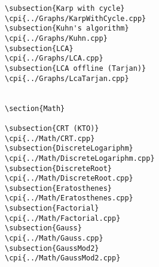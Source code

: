 {\begin{verbatim}
\subsection{Karp with cycle}
\cpi{../Graphs/KarpWithCycle.cpp}
\subsection{Kuhn's algorithm}
\cpi{../Graphs/Kuhn.cpp}
\subsection{LCA}
\cpi{../Graphs/LCA.cpp}
\subsection{LCA offline (Tarjan)}
\cpi{../Graphs/LcaTarjan.cpp}


\section{Math}

\subsection{CRT (KTO)}
\cpi{../Math/CRT.cpp}
\subsection{DiscreteLogariphm}
\cpi{../Math/DiscreteLogariphm.cpp}
\subsection{DiscreteRoot}
\cpi{../Math/DiscreteRoot.cpp}
\subsection{Eratosthenes}
\cpi{../Math/Eratosthenes.cpp}
\subsection{Factorial}
\cpi{../Math/Factorial.cpp}
\subsection{Gauss}
\cpi{../Math/Gauss.cpp}
\subsection{GaussMod2}
\cpi{../Math/GaussMod2.cpp}

\end{verbatim}}
